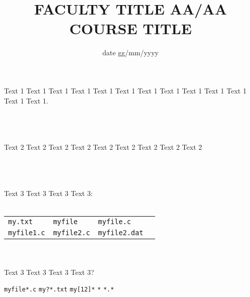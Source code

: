 \documentclass[9pt]{exam}
\title{\vspace{-1em}FACULTY TITLE AA/AA\\\Large{COURSE TITLE}\vspace{-2.4em}}
\date{date gg/mm/yyyy\vspace{-1.5em}}
\begin{document}
\maketitle

\begin{center}
\end{center}



\begin{questions}

\question
    Text 1 Text 1 Text 1 Text 1 Text 1 Text 1 Text 1 Text 1 Text 1 Text 1
    Text 1 Text 1 Text 1.\\\\
    \makebox[0.9\textwidth]{\$ \enspace\hrulefill}\\\\
    \makebox[0.9\textwidth]{\enspace\hrulefill}

\question
    Text 2 Text 2 Text 2 Text 2 Text 2 Text 2 Text 2 Text 2 Text 2\\\\
    \makebox[0.9\textwidth]{\$ \enspace\hrulefill}\\\\
    \makebox[0.9\textwidth]{\enspace\hrulefill}

\question
    Text 3 Text 3 Text 3 Text 3:\\\\
    \begin{tabular}{llll}
        \hline
        \texttt{my.txt} & \texttt{myfile} & \texttt{myfile.c}\\
        \texttt{myfile1.c} & \texttt{myfile2.c} & \texttt{myfile2.dat} \\
        \hline
    \end{tabular}\\\\
    Text 3 Text 3 Text 3 Text 3?
    \begin{checkboxes}
        \choice \texttt{myfile*.c} \quad \makebox[0.6\textwidth]{\$ \enspace\hrulefill}
        \choice \texttt{my?*.txt}  \quad \makebox[0.6\textwidth]{\$ \enspace\hrulefill}
        \choice \texttt{my[12]*}   \quad \makebox[0.6\textwidth]{\$ \enspace\hrulefill}
        \choice \texttt{*}         \quad \makebox[0.6\textwidth]{\$ \enspace\hrulefill}
        \choice \texttt{*.*}       \quad \makebox[0.6\textwidth]{\$ \enspace\hrulefill}
    \end{checkboxes}


\end{questions}
\end{document}
